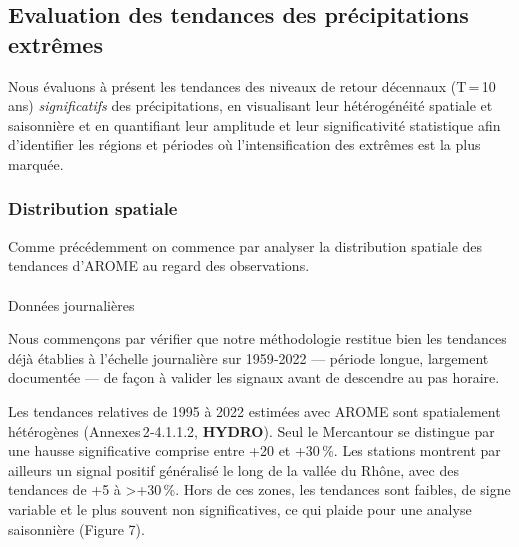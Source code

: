 \documentclass[
  article,
  nofooter,
  noheadings]{jss}
\makeatletter
\let\oldparagraph\paragraph
\renewcommand{\paragraph}{
    \@ifstar
      \xxxParagraphStar
      \xxxParagraphNoStar
  }
\newcommand{\xxxParagraphStar}[1]{\oldparagraph*{#1}\mbox{}}
\newcommand{\xxxParagraphNoStar}[1]{\oldparagraph{#1}\mbox{}}
\makeatother
\begin{document}
\subsection{Evaluation des tendances des précipitations
extrêmes}\label{evaluation-des-tendances-des-pruxe9cipitations-extruxeames}

Nous évaluons à présent les tendances des niveaux de retour décennaux
(T\,=\,10\,ans) \emph{significatifs} des précipitations, en visualisant
leur hétérogénéité spatiale et saisonnière et en quantifiant leur
amplitude et leur significativité statistique afin d'identifier les
régions et périodes où l'intensification des extrêmes est la plus
marquée.

\subsubsection{Distribution spatiale}\label{distribution-spatiale-1}

Comme précédemment on commence par analyser la distribution spatiale des
tendances d'AROME au regard des observations.

\paragraph{Données journalières}\label{donnuxe9es-journaliuxe8res}

Nous commençons par vérifier que notre méthodologie restitue bien les
tendances déjà établies à l'échelle journalière sur 1959‑2022 ---
période longue, largement documentée --- de façon à valider les signaux
avant de descendre au pas horaire.

Les tendances relatives de 1995 à 2022 estimées avec AROME sont
spatialement hétérogènes (Annexes\,2‑4.1.1.2, \textbf{HYDRO}). Seul le
Mercantour se distingue par une hausse significative comprise entre +20
et +30\,\%. Les stations montrent par ailleurs un signal positif
généralisé le long de la vallée du Rhône, avec des tendances de +5 à
\textgreater+30\,\%. Hors de ces zones, les tendances sont faibles, de
signe variable et le plus souvent non significatives, ce qui plaide pour
une analyse saisonnière (Figure 7).
\end{document}
